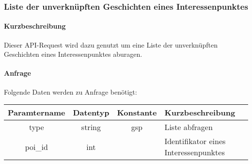\subsubsection{Liste der unverknüpften Geschichten eines Interessenpunktes }
\paragraph{Kurzbeschreibung}Dieser API-Request wird dazu genutzt um eine Liste der unverknüpften Geschichten eines Interessenpunktes aburagen.
\paragraph{Anfrage}Folgende Daten werden zu Anfrage benötigt:
\begin{table}[H]
	\begin{tabular}{|c|c|c|p{6.5cm}|}
		\hline
		\textbf{Paramtername} & \textbf{Datentyp} & \textbf{Konstante} & \textbf{Kurzbeschreibung}                                                                                               \\ \hline
		type                & string            & gsp                & Liste abfragen \\ \hline
		poi\_id             & int               &                    & Identifikator eines Interessenpunktes \\ \hline
	\end{tabular}
\end{table}
